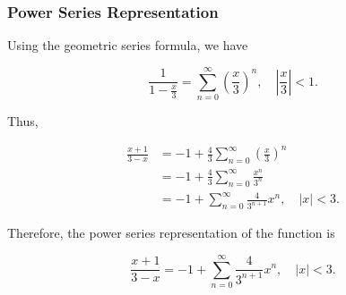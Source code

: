 \subsubsection{Power Series Representation}

Using the geometric series formula, we have

\[
\frac{1}{1 - \frac{x}{3}} = \sum_{n=0}^{\infty} {\left( \frac{x}{3} \right)}^n, \quad \left| \frac{x}{3} \right| < 1.
\]

Thus,

\begin{align*}
\frac{x + 1}{3 - x} &= -1 + \frac{4}{3} \sum_{n=0}^{\infty} {\left( \frac{x}{3} \right)}^n \\
&= -1 + \frac{4}{3} \sum_{n=0}^{\infty} \frac{x^n}{3^n} \\
&= -1 + \sum_{n=0}^{\infty} \frac{4}{3^{n+1}} x^n, \quad |x| < 3.
\end{align*}

Therefore, the power series representation of the function is

\[
\frac{x + 1}{3 - x} = -1 + \sum_{n=0}^{\infty} \frac{4}{3^{n+1}} x^n, \quad |x| < 3.
\]
